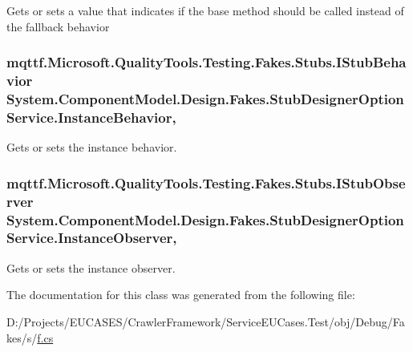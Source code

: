 Gets or sets a value that indicates if the base method should be called instead of the fallback behavior

\hypertarget{class_system_1_1_component_model_1_1_design_1_1_fakes_1_1_stub_designer_option_service_a3fda9b96ea399e32069f8e51cb8232a5}{
\subsubsection[{Instance\-Behavior}]{\setlength{\rightskip}{0pt plus 5cm}mqttf.\-Microsoft.\-Quality\-Tools.\-Testing.\-Fakes.\-Stubs.\-I\-Stub\-Behavior System.\-Component\-Model.\-Design.\-Fakes.\-Stub\-Designer\-Option\-Service.\-Instance\-Behavior\hspace{0.3cm}{\ttfamily [get]}, {\ttfamily [set]}}}\label{class_system_1_1_component_model_1_1_design_1_1_fakes_1_1_stub_designer_option_service_a3fda9b96ea399e32069f8e51cb8232a5}


Gets or sets the instance behavior.

\hypertarget{class_system_1_1_component_model_1_1_design_1_1_fakes_1_1_stub_designer_option_service_abf0a0702d050e2ef53c96932dc8400cf}{
\subsubsection[{Instance\-Observer}]{\setlength{\rightskip}{0pt plus 5cm}mqttf.\-Microsoft.\-Quality\-Tools.\-Testing.\-Fakes.\-Stubs.\-I\-Stub\-Observer System.\-Component\-Model.\-Design.\-Fakes.\-Stub\-Designer\-Option\-Service.\-Instance\-Observer\hspace{0.3cm}{\ttfamily [get]}, {\ttfamily [set]}}}\label{class_system_1_1_component_model_1_1_design_1_1_fakes_1_1_stub_designer_option_service_abf0a0702d050e2ef53c96932dc8400cf}


Gets or sets the instance observer.



The documentation for this class was generated from the following file\-:\begin{DoxyCompactItemize}
\item 
D\-:/\-Projects/\-E\-U\-C\-A\-S\-E\-S/\-Crawler\-Framework/\-Service\-E\-U\-Cases.\-Test/obj/\-Debug/\-Fakes/s/\hyperlink{s_2f_8cs}{f.\-cs}\end{DoxyCompactItemize}
